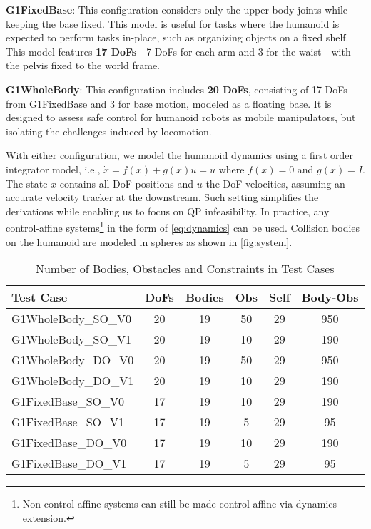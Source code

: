 \textbf{G1FixedBase}:
This configuration considers only the upper body joints while keeping the base fixed.
This model is useful for tasks where the humanoid is expected to perform tasks in-place, such as organizing objects on a fixed shelf.
This model features \textbf{17 DoFs}—7 DoFs for each arm and 3 for the waist—with the pelvis fixed to the world frame.



\textbf{G1WholeBody}:
This configuration includes \textbf{20 DoFs}, consisting of 17 DoFs from G1FixedBase and 3 for base motion, modeled as a floating base.
It is designed to assess safe control for humanoid robots as mobile manipulators, but isolating the challenges induced by locomotion.

With either configuration, we model the humanoid dynamics using a first order integrator model, i.e., $\dot{x} = f(x) + g(x)u = u$ where $f(x) = 0$ and $g(x) = I$.
The state $x$ contains all DoF positions and $u$ the DoF velocities, assuming an accurate velocity tracker at the downstream.
Such setting simplifies the derivations while enabling us to focus on QP infeasibility.
In practice, any control-affine systems\footnote{Non-control-affine systems can still be made control-affine via dynamics extension.} in the form of \eqref{eq:dynamics} can be used.
Collision bodies on the humanoid are modeled in spheres as shown in \cref{fig:system}.
\begin{table}[htbp]
\centering
\captionsetup{width=0.95\textwidth}
\caption{Number of Bodies, Obstacles and Constraints in Test Cases}
\label{tab:test_case_size}

\begin{tabular}{lccccc}
\toprule
\textbf{Test Case} & \textbf{DoFs} & \textbf{Bodies} & \textbf{Obs} & \textbf{Self} & \textbf{Body-Obs} \\
\midrule
G1WholeBody\_SO\_V0 & 20 & 19 & 50 & 29 & 950 \\
G1WholeBody\_SO\_V1 & 20 & 19 & 10 & 29 & 190 \\
G1WholeBody\_DO\_V0 & 20 & 19 & 50 & 29 & 950\\
G1WholeBody\_DO\_V1 & 20 & 19 & 10 & 29 & 190 \\
G1FixedBase\_SO\_V0 & 17 & 19 & 10 & 29 & 190\\
G1FixedBase\_SO\_V1 & 17 & 19 & 5 & 29 & 95 \\
G1FixedBase\_DO\_V0 & 17 & 19 & 10 & 29 & 190\\
G1FixedBase\_DO\_V1 & 17 & 19 & 5 & 29 & 95\\
\bottomrule
\end{tabular}

\end{table}

